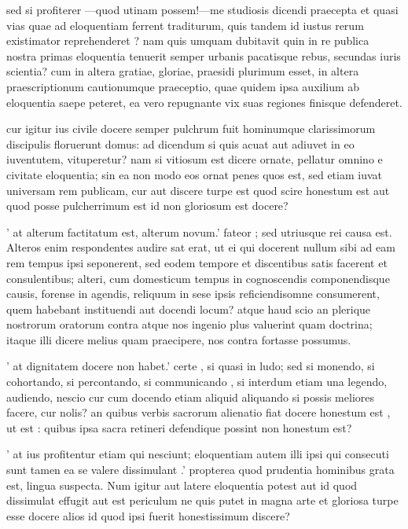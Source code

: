  sed si profiterer —quod utinam possem!—me studiosis dicendi praecepta et quasi vias quae ad eloquentiam ferrent traditurum, quis tandem id iustus rerum existimator reprehenderet ? nam quis umquam dubitavit quin in re publica nostra primas eloquentia tenuerit semper urbanis pacatisque rebus, secundas iuris scientia? cum in altera gratiae, gloriae, praesidi plurimum esset, in altera praescriptionum cautionumque praeceptio, quae quidem ipsa auxilium ab eloquentia saepe peteret, ea vero repugnante vix suas regiones finisque defenderet.

 cur igitur ius civile docere semper pulchrum fuit hominumque clarissimorum discipulis floruerunt domus: ad dicendum si quis acuat aut adiuvet in eo iuventutem, vituperetur? nam si vitiosum est dicere ornate, pellatur omnino e civitate eloquentia; sin ea non modo eos ornat penes quos est, sed etiam iuvat universam rem publicam, cur aut discere turpe est quod scire honestum est aut quod posse pulcherrimum est id non gloriosum est docere?

 ' at alterum factitatum est, alterum novum.' fateor ; sed utriusque rei causa est. Alteros enim respondentes audire sat erat, ut ei qui docerent nullum sibi ad eam rem tempus ipsi seponerent, sed eodem tempore et discentibus satis facerent et consulentibus; alteri, cum domesticum tempus in cognoscendis componendisque causis, forense in agendis, reliquum in sese ipsis reficiendisomne consumerent, quem habebant instituendi aut docendi locum? atque haud scio an plerique nostrorum oratorum contra atque nos ingenio plus valuerint quam doctrina; itaque illi dicere melius quam praecipere, nos contra fortasse possumus.

 ' at dignitatem docere non habet.' certe , si quasi in ludo; sed si monendo, si cohortando, si percontando, si communicando , si interdum etiam una legendo, audiendo, nescio cur cum docendo etiam aliquid aliquando si possis meliores facere, cur nolis? an quibus verbis sacrorum alienatio fiat docere honestum est , ut est : quibus ipsa sacra retineri defendique possint non honestum est?

 ' at ius profitentur etiam qui nesciunt; eloquentiam autem illi ipsi qui consecuti sunt tamen ea se valere dissimulant .' propterea quod prudentia hominibus grata est, lingua suspecta. Num igitur aut latere eloquentia potest aut id quod dissimulat effugit aut est periculum ne quis putet in magna arte et gloriosa turpe esse docere alios id quod ipsi fuerit honestissimum discere?

